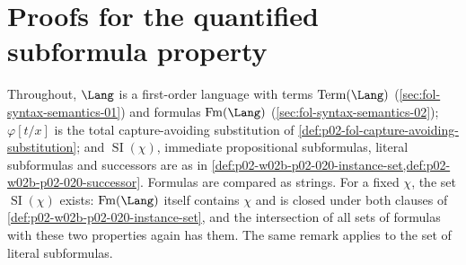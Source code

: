 \section{Proofs for the quantified subformula property}
\label{sec:annex-p02-w02b-p02-020-subformula-proof}

Throughout, \(\Lang\) is a first-order language with terms
\(\operatorname{Term}(\Lang)\) (\cref{sec:fol-syntax-semantics-01}) and formulas
\(\operatorname{Fm}(\Lang)\) (\cref{sec:fol-syntax-semantics-02}); \(\varphi[t/x]\) is
the total capture-avoiding substitution of
\cref{def:p02-fol-capture-avoiding-substitution}; and
\(\operatorname{SI}(\chi)\), immediate propositional subformulas, literal
subformulas and successors are as in
\cref{def:p02-w02b-p02-020-instance-set,def:p02-w02b-p02-020-successor}.
Formulas are compared as strings.  For a fixed \(\chi\), the set
\(\operatorname{SI}(\chi)\) exists: \(\operatorname{Fm}(\Lang)\) itself
contains \(\chi\) and is closed under both clauses of
\cref{def:p02-w02b-p02-020-instance-set}, and the intersection of all sets of
formulas with these two properties again has them.  The same remark applies to
the set of literal subformulas.

